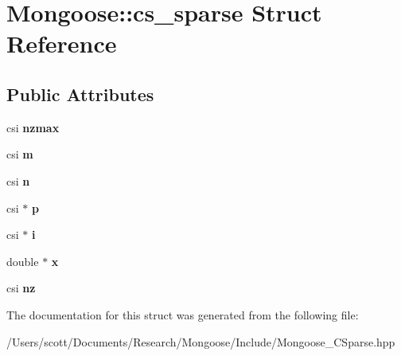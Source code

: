 \hypertarget{struct_mongoose_1_1cs__sparse}{}\section{Mongoose\+:\+:cs\+\_\+sparse Struct Reference}
\label{struct_mongoose_1_1cs__sparse}
\subsection*{Public Attributes}
\begin{DoxyCompactItemize}
\item 
\hypertarget{struct_mongoose_1_1cs__sparse_a4b62d44f6e046a11e24fb4028bf43a58}{}\label{struct_mongoose_1_1cs__sparse_a4b62d44f6e046a11e24fb4028bf43a58} 
csi {\bfseries nzmax}
\item 
\hypertarget{struct_mongoose_1_1cs__sparse_ad08c828ac4d26770ff476157109a6ab2}{}\label{struct_mongoose_1_1cs__sparse_ad08c828ac4d26770ff476157109a6ab2} 
csi {\bfseries m}
\item 
\hypertarget{struct_mongoose_1_1cs__sparse_a477b87510bd9ab4fd0be42b280298bcd}{}\label{struct_mongoose_1_1cs__sparse_a477b87510bd9ab4fd0be42b280298bcd} 
csi {\bfseries n}
\item 
\hypertarget{struct_mongoose_1_1cs__sparse_adcc930ca8f0aa79060ae413f76e8d946}{}\label{struct_mongoose_1_1cs__sparse_adcc930ca8f0aa79060ae413f76e8d946} 
csi $\ast$ {\bfseries p}
\item 
\hypertarget{struct_mongoose_1_1cs__sparse_a9733803e561ead0b40cfb544f3fc288e}{}\label{struct_mongoose_1_1cs__sparse_a9733803e561ead0b40cfb544f3fc288e} 
csi $\ast$ {\bfseries i}
\item 
\hypertarget{struct_mongoose_1_1cs__sparse_aea951a87409147febd5e2fcf5b798e36}{}\label{struct_mongoose_1_1cs__sparse_aea951a87409147febd5e2fcf5b798e36} 
double $\ast$ {\bfseries x}
\item 
\hypertarget{struct_mongoose_1_1cs__sparse_a38b622c3f519f870e72c119fbf8cbc17}{}\label{struct_mongoose_1_1cs__sparse_a38b622c3f519f870e72c119fbf8cbc17} 
csi {\bfseries nz}
\end{DoxyCompactItemize}


The documentation for this struct was generated from the following file\+:\begin{DoxyCompactItemize}
\item 
/\+Users/scott/\+Documents/\+Research/\+Mongoose/\+Include/Mongoose\+\_\+\+C\+Sparse.\+hpp\end{DoxyCompactItemize}
